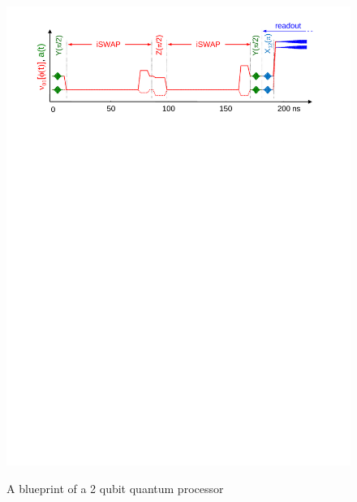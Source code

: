 \begin{figure}
	\centering
		\includegraphics[width=1.\textwidth]{./material/papers/grover/figures/grover_algorithm_pulse_sequence}
	\label{fig:Grover3}
	\caption{}
\end{figure}



\begin{figure}
	\centering
	\label{fig:iSwap1}
	\caption{}
\end{figure}

\begin{figure}
	\centering
	\label{fig:iSwap2}
	\caption{A blueprint of a 2 qubit quantum processor}
\end{figure}

\begin{figure}
	\centering
	\label{fig:iSwap3}
	\caption{}
\end{figure}

\begin{figure}
	\centering
	\label{fig:iSwap4}
	\caption{}
\end{figure}
